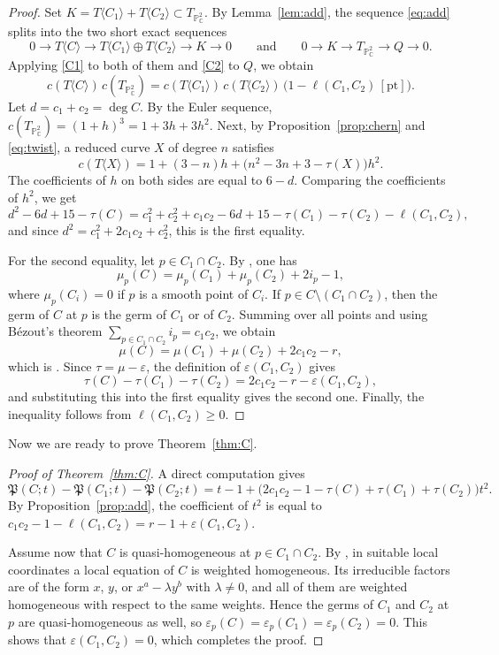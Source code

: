 \documentclass[11pt]{amsart}
\theoremstyle{definition}
\numberwithin{equation}{section}
\newcommand{\PP}{\mathbb{P}}
\newcommand{\CC}{\mathbb{C}}
\newcommand{\Pfrak}{\mathfrak{P}}
\newcommand{\pt}{\mathrm{pt}}
\begin{document}
\begin{proof}
Set $K=T\langle C_1\rangle+T\langle C_2\rangle\subset T_{\PP^2_\CC}$.
By Lemma~\ref{lem:add}, the sequence \eqref{eq:add} splits into the two short exact sequences
\[
0\to T\langle C\rangle\to T\langle C_1\rangle\oplus T\langle C_2\rangle\to K\to 0
\qquad\text{and}\qquad
0\to K\to T_{\PP^2_\CC}\to Q\to 0 .
\]
Applying \ref{C1} to both of them and \ref{C2} to $Q$, we obtain
\[
c(T\langle C\rangle)\,c(T_{\PP^2_\CC})
=c(T\langle C_1\rangle)\,c(T\langle C_2\rangle)\,\bigl(1-\ell(C_1,C_2)\,[\pt]\bigr).
\]
Let $d=c_1+c_2=\deg C$. By the Euler sequence, $c(T_{\PP^2_\CC})=(1+h)^3=1+3h+3h^2$.
Next, by Proposition~\ref{prop:chern} and \eqref{eq:twist}, a reduced curve $X$ of degree $n$ satisfies
\[
c(T\langle X\rangle)=1+(3-n)h+\bigl(n^2-3n+3-\tau(X)\bigr)h^2 .
\]
The coefficients of $h$ on both sides are equal to $6-d$. Comparing the coefficients of $h^2$, we get
\[
d^2-6d+15-\tau(C)
=c_1^2+c_2^2+c_1c_2-6d+15-\tau(C_1)-\tau(C_2)-\ell(C_1,C_2),
\]
and since $d^2=c_1^2+2c_1c_2+c_2^2$, this is the first equality.

For the second equality, let $p\in C_1\cap C_2$. By \cite[Theorem~6.5.1]{Wa}, one has
\[
\mu_p(C)=\mu_p(C_1)+\mu_p(C_2)+2i_p-1,
\]
where $\mu_p(C_i)=0$ if $p$ is a smooth point of $C_i$.
If $p\in C\setminus(C_1\cap C_2)$, then the germ of $C$ at $p$ is the germ of $C_1$ or of $C_2$.
Summing over all points and using B\'ezout's theorem $\sum_{p\in C_1\cap C_2}i_p=c_1c_2$, we obtain
\[
\mu(C)=\mu(C_1)+\mu(C_2)+2c_1c_2-r,
\]
which is \cite[Lemma~3.1]{Po24}. Since $\tau=\mu-\varepsilon$, the definition of $\varepsilon(C_1,C_2)$ gives
\[
\tau(C)-\tau(C_1)-\tau(C_2)=2c_1c_2-r-\varepsilon(C_1,C_2),
\]
and substituting this into the first equality gives the second one.
Finally, the inequality follows from $\ell(C_1,C_2)\ge0$.
\end{proof}

Now we are ready to prove Theorem~\ref{thm:C}.

\begin{proof}[Proof of Theorem~\ref{thm:C}]
A direct computation gives
\[
\Pfrak(C;t)-\Pfrak(C_1;t)-\Pfrak(C_2;t)=t-1+\bigl(2c_1c_2-1-\tau(C)+\tau(C_1)+\tau(C_2)\bigr)t^2 .
\]
By Proposition~\ref{prop:add}, the coefficient of $t^2$ is equal to $c_1c_2-1-\ell(C_1,C_2)=r-1+\varepsilon(C_1,C_2)$.

Assume now that $C$ is quasi-homogeneous at $p\in C_1\cap C_2$.
By \cite{Sa71}, in suitable local coordinates a local equation of $C$ is weighted homogeneous.
Its irreducible factors are of the form $x$, $y$, or $x^a-\lambda y^b$ with $\lambda\neq0$, and all of them are weighted homogeneous with respect to the same weights.
Hence the germs of $C_1$ and $C_2$ at $p$ are quasi-homogeneous as well, so $\varepsilon_p(C)=\varepsilon_p(C_1)=\varepsilon_p(C_2)=0$.
This shows that $\varepsilon(C_1,C_2)=0$, which completes the proof.
\end{proof}
\end{document}
